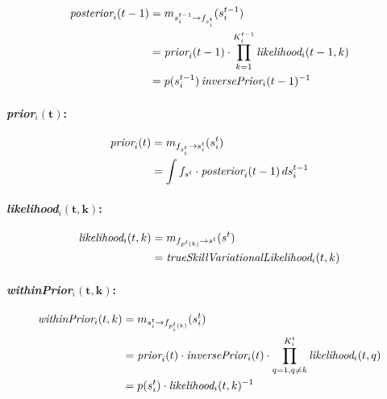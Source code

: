 \documentclass[article]{jss}
\begin{document}
\begin{equation}
\begin{split}
  \emph{posterior}_i(t-1)&= m_{s_i^{t-1}\rightarrow f_{s_i^t}}(s_i^{t-1}) \\
 &= \emph{prior}_i(t-1) \cdot \prod_{k=1}^{K_i^{t-1}} \emph{likelihood}_i(t-1,k)\\
 &= p(s_i^{t-1}) \, \emph{inversePrior}_i(t-1)^{-1}
 \end{split}
\end{equation}


 \paragraph{\emph{prior}$_i\bm{(t)}$:}

 \begin{equation}
 \begin{split}
  \emph{prior}_i(t) &= m_{f_{s_i^t} \rightarrow s_i^t}(s_i^t) \\
  &= \int f_{s^t} \cdot \emph{posterior}_i(t-1) \, ds_i^{t-1}
  \end{split}
 \end{equation}

 \paragraph{\emph{likelihood}$_i\bm{(t,k)}$:}

 \begin{equation}
 \begin{split}
  \emph{likelihood}_i(t,k) &= m_{f_{p^{t}(k)} \rightarrow s^t}(s^t) \\
  &= \emph{trueSkillVariationalLikelihood}_i(t,k)
  \end{split}
 \end{equation}

 \paragraph{\emph{withinPrior}$_i\bm{(t,k)}$:}


 \begin{equation}
 \begin{split}
 \emph{withinPrior}_i(t,k) &= m_{s_i^t \rightarrow f_{p_i^t(k)}}(s_i^t)  \\
 &= \emph{prior}_i(t) \cdot \emph{inversePrior}_i(t) \cdot \prod_{q=1, q\neq k}^{K_i^t} \emph{likelihood}_i(t,q) \\
 &= p(s_i^t) \cdot \emph{likelihood}_i(t,k)^{-1}
  \end{split}
 \end{equation}
\end{document}
